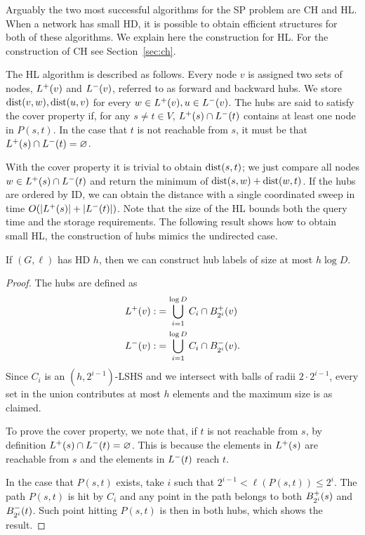 Arguably the two most successful algorithms for the SP problem are CH and HL.
When a network has small HD, it is possible to obtain efficient structures for both of these algorithms.
We explain here the construction for HL.
For the construction of CH see Section~\ref{sec:ch}.

The HL algorithm is described as follows.
Every node $v$ is assigned two sets of nodes, $L^+(v)$ and $L^-(v)$, referred to as forward and backward hubs.
We store $\text{dist}(v,w),\text{dist}(u,v)$ for every $w\in L^+(v),u\in L^-(v)$.
The hubs are said to satisfy the cover property if, for any $s\neq t\in V$, $L^+(s)\cap L^-(t)$ contains at least one node in $P(s,t)$.
In the case that $t$ is not reachable from $s$, it must be that $L^+(s)\cap L^-(t)=\varnothing$.

With the cover property it is trivial to obtain $\text{dist}(s,t)$; we just compare all nodes $w\in L^+(s)\cap L^-(t)$ and return the minimum of $\text{dist}(s,w)+\text{dist}(w,t)$.
If the hubs are ordered by ID, we can obtain the distance with a single coordinated sweep in time $O(\lvert L^+(s)\rvert+\lvert L^-(t)\rvert)$.
Note that the size of the HL bounds both the query time and the storage requirements.
The following result shows how to obtain small HL, the construction of hubs mimics the undirected case.

\begin{theorem}\label{theo:construct_hl}
If $(G,\ell)$ has HD $h$, then we can construct hub labels of size at most $h\log D$.
\end{theorem}
\begin{proof}
The hubs are defined as
\begin{align*}
L^+(v):&=  \bigcup_{i=1}^{\log D}C_i\cap B^+_{2^i}(v)\\
L^-(v):&= \bigcup_{i=1}^{\log D}C_i\cap B^-_{2^i}(v).
\end{align*}
Since $C_i$ is an $(h,2^{i-1})$-LSHS and we intersect with balls of radii $2\cdot 2^{i-1}$, every set in the union contributes at most $h$ elements and the maximum size is as claimed.

To prove the cover property, we note that, if $t$ is not reachable from $s$, by definition $L^+(s)\cap L^-(t)=\varnothing$.
This is because the elements in $L^+(s)$ are reachable from $s$ and the elements in $L^-(t)$ reach $t$.

In the case that $P(s,t)$ exists, take $i$ such that $2^{i-1}<\ell(P(s,t))\leq 2^i$.
The path $P(s,t)$ is hit by $C_i$ and any point in the path belongs to both $B^+_{2^i}(s)$ and $B^-_{2^i}(t)$.
Such point hitting $P(s,t)$ is then in both hubs, which shows the result.
\end{proof}

